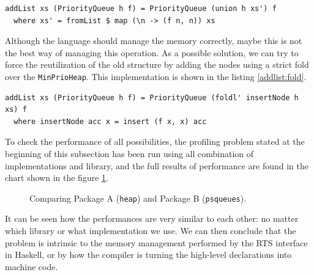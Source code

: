 \begin{lstlisting}[style=haskell, caption= \texttt{addList} using
  \texttt{union}, label=addlist:union]
addList xs (PriorityQueue h f) = PriorityQueue (union h xs') f
  where xs' = fromList $ map (\n -> (f n, n)) xs
\end{lstlisting}

Although the language should manage the memory correctly, maybe this is not the
best way of managing this operation. As a possible solution, we can try to
force the reutilization of the old structure by adding the nodes using a strict
fold over the \texttt{MinPrioHeap}. This implementation is shown in the listing
\ref{addlist:fold}.\\

\begin{lstlisting}[style=haskell, caption= \texttt{addList} using
  \texttt{fold'}, label=addlist:fold]
addList xs (PriorityQueue h f) = PriorityQueue (foldl' insertNode h xs) f
  where insertNode acc x = insert (f x, x) acc
\end{lstlisting}

To check the performance of all possibilities, the profiling problem stated at
the beginning of this subsection has been run using all combination of
implementations and library, and the full results of performance are found in
the chart shown in the figure \ref{chart-libraries}.\\

\begin{figure}[ht]
  \centering
{}
\vspace{-1cm}
\caption{Comparing Package A (\texttt{heap}) and Package B
  (\texttt{psqueues}).}
\label{chart-libraries}
\end{figure}

It can be seen how the performances are very similar to each other: no matter
which library or what implementation we use. We can then conclude that the
problem is intrinsic to the memory management performed by the RTS interface in
Haskell, or by how the compiler is turning the high-level declarations into
machine code.\\

